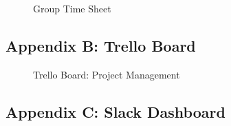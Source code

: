\documentclass[12pt]{article} %
\begin{document}
	\begin{figure}[H] %
		\caption{Group Time Sheet}
		\label{fig:speciation}
	\end{figure}
	
	\newpage
	
	\subsection{Appendix B: Trello Board}
	
	
	\begin{figure}[H] %
		\caption{Trello Board: Project Management}
		\label{fig:speciation}
	\end{figure}
	
	\newpage
	
	\subsection{Appendix C: Slack Dashboard}
	
\end{document}
